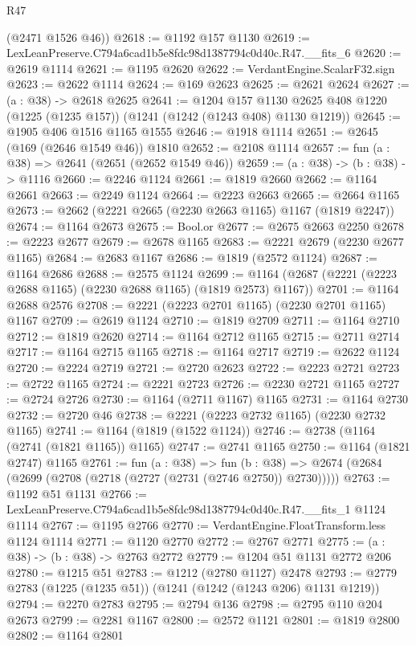 \begin{lexlean}{R47}
\begin{coremodule}
      (@2471 @1526 @46))
@2618 := @1192 @157 @1130
@2619 := LexLeanPreserve.C794a6cad1b5e8fdc98d1387794c0d40c.R47.__fits_6
@2620 := @2619 @1114
@2621 := @1195 @2620
@2622 := VerdantEngine.ScalarF32.sign
@2623 := @2622 @1114
@2624 := @169 @2623
@2625 := @2621 @2624
@2627 := (a : @38) -> @2618 @2625
@2641 := @1204
    @157
    @1130
    @2625
    @408
    @1220
    (@1225 (@1235 @157))
    (@1241 (@1242 (@1243 @408) @1130 @1219))
@2645 := @1905 @406 @1516 @1165 @1555
@2646 := @1918 @1114
@2651 := @2645 (@169 (@2646 @1549 @46)) @1810
@2652 := @2108 @1114
@2657 := fun (a : @38) => @2641 (@2651 (@2652 @1549 @46))
@2659 := (a : @38) -> (b : @38) -> @1116
@2660 := @2246 @1124
@2661 := @1819 @2660
@2662 := @1164 @2661
@2663 := @2249 @1124
@2664 := @2223 @2663
@2665 := @2664 @1165
@2673 := @2662 (@2221 @2665 (@2230 @2663 @1165) @1167 (@1819 @2247))
@2674 := @1164 @2673
@2675 := Bool.or
@2677 := @2675 @2663 @2250
@2678 := @2223 @2677
@2679 := @2678 @1165
@2683 := @2221 @2679 (@2230 @2677 @1165)
@2684 := @2683 @1167
@2686 := @1819 (@2572 @1124)
@2687 := @1164 @2686
@2688 := @2575 @1124
@2699 := @1164 (@2687 (@2221 (@2223 @2688 @1165) (@2230 @2688 @1165) (@1819 @2573) @1167))
@2701 := @1164 @2688 @2576
@2708 := @2221 (@2223 @2701 @1165) (@2230 @2701 @1165) @1167
@2709 := @2619 @1124
@2710 := @1819 @2709
@2711 := @1164 @2710
@2712 := @1819 @2620
@2714 := @1164 @2712 @1165
@2715 := @2711 @2714
@2717 := @1164 @2715 @1165
@2718 := @1164 @2717
@2719 := @2622 @1124
@2720 := @2224 @2719
@2721 := @2720 @2623
@2722 := @2223 @2721
@2723 := @2722 @1165
@2724 := @2221 @2723
@2726 := @2230 @2721 @1165
@2727 := @2724 @2726
@2730 := @1164 (@2711 @1167) @1165
@2731 := @1164 @2730
@2732 := @2720 @46
@2738 := @2221 (@2223 @2732 @1165) (@2230 @2732 @1165)
@2741 := @1164 (@1819 (@1522 @1124))
@2746 := @2738 (@1164 (@2741 (@1821 @1165)) @1165)
@2747 := @2741 @1165
@2750 := @1164 (@1821 @2747) @1165
@2761 := fun (a : @38) =>
  fun (b : @38) => @2674 (@2684 (@2699 (@2708 (@2718 (@2727 (@2731 (@2746 @2750)) @2730)))))
@2763 := @1192 @51 @1131
@2766 := LexLeanPreserve.C794a6cad1b5e8fdc98d1387794c0d40c.R47.__fits_1 @1124 @1114
@2767 := @1195 @2766
@2770 := VerdantEngine.FloatTransform.less @1124 @1114
@2771 := @1120 @2770
@2772 := @2767 @2771
@2775 := (a : @38) -> (b : @38) -> @2763 @2772
@2779 := @1204 @51 @1131 @2772 @206
@2780 := @1215 @51
@2783 := @1212 (@2780 @1127) @2478
@2793 := @2779 @2783 (@1225 (@1235 @51)) (@1241 (@1242 (@1243 @206) @1131 @1219))
@2794 := @2270 @2783
@2795 := @2794 @136
@2798 := @2795 @110 @204 @2673
@2799 := @2281 @1167
@2800 := @2572 @1121
@2801 := @1819 @2800
@2802 := @1164 @2801

\end{coremodule}
\end{lexlean}

